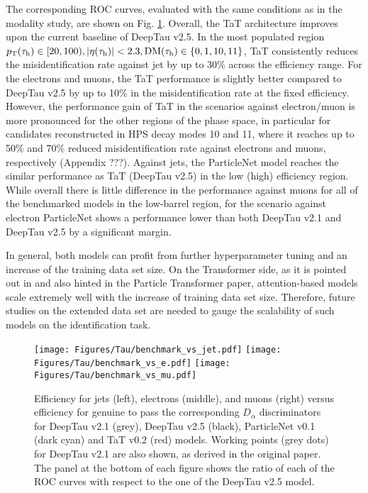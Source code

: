 The corresponding ROC curves, evaluated with the same conditions as in the modality study, are shown on Fig. \ref{fig:benchmark}. Overall, the TaT architecture improves upon the current baseline of DeepTau v2.5. In the most populated region $p_\text{T}(\tau_\mathrm{h}) \in [20,100), |\eta(\tau_\mathrm{h})| < 2.3, \text{DM}(\tau_\mathrm{h}) \in \{0,1,10,11\}$, TaT consistently reduces the misidentification rate against jet by up to 30\% across the \tauh efficiency range. For the electrons and muons, the TaT performance is slightly better compared to DeepTau v2.5 by up to 10\% in the misidentification rate at the fixed \tauh efficiency. However, the performance gain of TaT in the scenarios against electron/muon is more pronounced for the other regions of the phase space, in particular for \tauh candidates reconstructed in HPS decay modes 10 and 11, where it reaches up to 50\% and 70\% reduced misidentification rate against electrons and muons, respectively (Appendix ???). Against jets, the ParticleNet model reaches the similar performance as TaT (DeepTau v2.5) in the low (high) \tauh efficiency region. While overall there is little difference in the performance against muons for all of the benchmarked models in the low-\pt barrel region, for the scenario against electron ParticleNet shows a performance lower than both DeepTau v2.1 and DeepTau v2.5 by a significant margin.

In general, both models can profit from further hyperparameter tuning and an increase of the training data set size. On the Transformer side, as it is pointed out in \cite{hoffmann2022training} and also hinted in the Particle Transformer paper, attention-based models scale extremely well with the increase of training data set size. Therefore, future studies on the extended data set are needed to gauge the scalability of such models on the \tauh identification task.

\begin{figure}[!t]
    \centering
    \texttt{[image: Figures/Tau/benchmark\_vs\_jet.pdf]}
    \texttt{[image: Figures/Tau/benchmark\_vs\_e.pdf]}
    \texttt{[image: Figures/Tau/benchmark\_vs\_mu.pdf]}
    \caption{Efficiency for jets (left), electrons (middle), and muons (right) versus efficiency for genuine \tauh to pass the corresponding $D_\alpha$ discriminators for DeepTau v2.1 (grey), DeepTau v2.5 (black), ParticleNet v0.1 (dark cyan) and TaT v0.2 (red) models. Working points (grey dots) for DeepTau v2.1 are also shown, as derived in the original paper. The panel at the bottom of each figure shows the ratio of each of the ROC curves with respect to the one of the DeepTau v2.5 model.}
    \label{fig:benchmark}
\end{figure}

